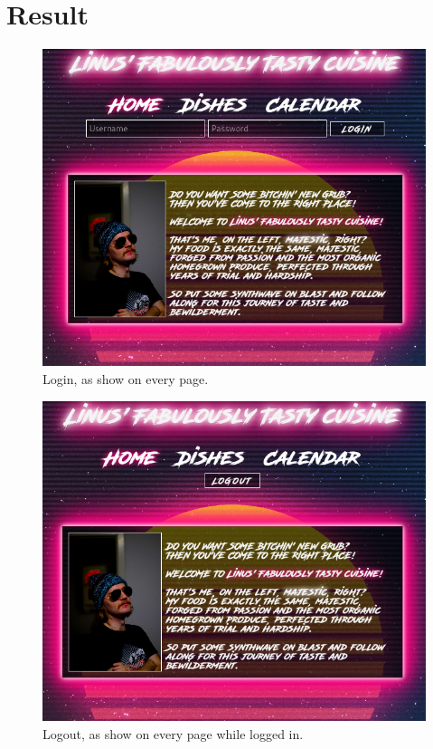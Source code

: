 \documentclass[a4paper]{scrartcl}
\begin{document}
\section{Result}

\begin{figure}[H]
  \begin{center}
    \includegraphics[scale=0.3]{images/login.png}
    \caption{Login, as show on every page.}
    \label{fig:login}
  \end{center}
\end{figure}

\begin{figure}[H]
  \begin{center}
    \includegraphics[scale=0.3]{images/logout.png}
    \caption{Logout, as show on every page while logged in.}
    \label{fig:logout}
  \end{center}
\end{figure}
\end{document}

